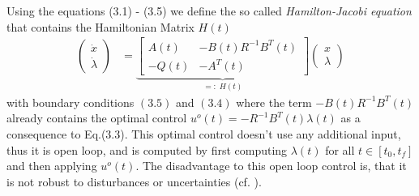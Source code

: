 \documentclass[paper=a4, pagesize, DIV=calc, BCOR=12.5mm, twoside=on, onecolumn=on, open = any, titlepage =on, parskip =half-, headsepline = on, footsepline = on, chapterprefix = on, appendixprefix = off, fontsize = 12pt, numbers = noenddot, abstract = on]{scrbook}
\numberwithin{equation}{chapter}
\theoremstyle{definition}
\theoremstyle{plain}
\theoremstyle{plain}
\theoremstyle{remark}
\theoremstyle{plain}
\theoremstyle{plain}
\begin{document}
Using the equations (3.1) - (3.5) we define the so called \emph{Hamilton-Jacobi equation} that contains the Hamiltonian Matrix $H(t)$
\renewcommand\arraystretch{1}
\begin{align}
\begin{pmatrix}
\dot{x}\\
\dot{\lambda}
\end{pmatrix} &= 
\underbrace{\begin{bmatrix}
A(t) & -B(t)R^{-1}B^T(t)\\
-Q(t) & -A^T(t)
\end{bmatrix}}_{=: \; H(t)}
\begin{pmatrix}
x\\
\lambda
\end{pmatrix}
\end{align} \label{eq:HJE}
with boundary conditions $ (3.5)$ and $(3.4)$ where the term $-B(t)R^{-1}B^T(t)$ already contains the optimal control $u^o(t) = -R^{-1}B^T(t)\lambda(t)$ as a consequence to Eq.(3.3). This optimal control doesn't use any additional input, thus it is open loop, and is computed by first computing $\lambda(t)$ for all $t \in \left[ t_0, t_f \right]$ and then applying $u^o(t)$. The disadvantage to this open loop control is, that it is not robust to disturbances or uncertainties (cf. \cite{li:2006}).

\par \singlespacing
\end{document}

